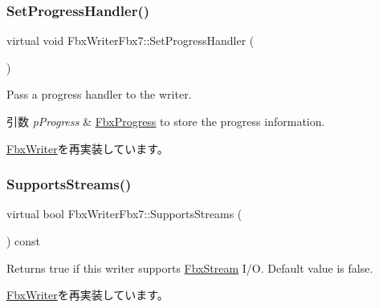 \mbox{\label{class_fbx_writer_fbx7_a80285d709aabb9d36f3f10d95cebf356}} 
\subsubsection{\texorpdfstring{Set\+Progress\+Handler()}{SetProgressHandler()}}
{\footnotesize\ttfamily virtual void Fbx\+Writer\+Fbx7\+::\+Set\+Progress\+Handler (\begin{DoxyParamCaption}\item[{\hyperlink{class_fbx_progress}{Fbx\+Progress} $\ast$}]{ }\end{DoxyParamCaption})\hspace{0.3cm}{\ttfamily [virtual]}}

Pass a progress handler to the writer. 
\begin{DoxyParams}{引数}
{\em p\+Progress} & \hyperlink{class_fbx_progress}{Fbx\+Progress} to store the progress information. \\
\hline
\end{DoxyParams}


\hyperlink{class_fbx_writer_a1a3cf241a0c11364981ebd23be59fd8f}{Fbx\+Writer}を再実装しています。

\mbox{\label{class_fbx_writer_fbx7_a1db3d07967773f3b1af23d15757c281a}} 
\subsubsection{\texorpdfstring{Supports\+Streams()}{SupportsStreams()}}
{\footnotesize\ttfamily virtual bool Fbx\+Writer\+Fbx7\+::\+Supports\+Streams (\begin{DoxyParamCaption}{ }\end{DoxyParamCaption}) const\hspace{0.3cm}{\ttfamily [virtual]}}

Returns true if this writer supports \hyperlink{class_fbx_stream}{Fbx\+Stream} I/O. Default value is false. 

\hyperlink{class_fbx_writer_aa79a285227d113ee6d64aee6a84986cd}{Fbx\+Writer}を再実装しています。

